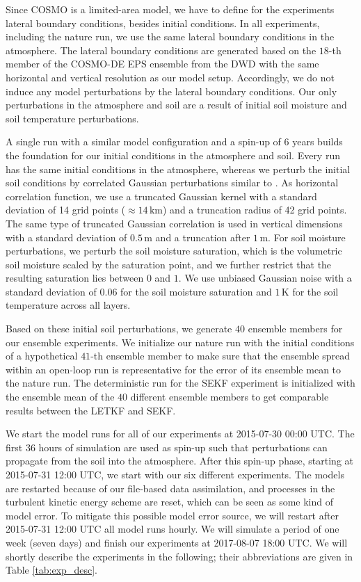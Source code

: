 \documentclass[hess, manuscript]{copernicus}
\begin{document}
Since COSMO is a limited-area model, we have to define for the experiments lateral boundary conditions, besides initial conditions.
In all experiments, including the nature run, we use the same lateral boundary conditions in the atmosphere.
The lateral boundary conditions are generated based on the $18$-th member of the COSMO-DE EPS ensemble from the DWD with the same horizontal and vertical resolution as our model setup.
Accordingly, we do not induce any model perturbations by the lateral boundary conditions.
Our only perturbations in the atmosphere and soil are a result of initial soil moisture and soil temperature perturbations.

A single run with a similar model configuration and a spin-up of $6$ years builds the foundation for our initial conditions in the atmosphere and soil.
Every run has the same initial conditions in the atmosphere, whereas we perturb the initial soil conditions by correlated Gaussian perturbations similar to \cite{schraff_kilometre-scale_2016}.
As horizontal correlation function, we use a truncated Gaussian kernel with a standard deviation of 14 grid points ($\approx 14 \,\text{km}$) and a truncation radius of 42 grid points.
The same type of truncated Gaussian correlation is used in vertical dimensions with a standard deviation of $0.5\,\text{m}$ and a truncation after $1\,\text{m}$.
For soil moisture perturbations, we perturb the soil moisture saturation, which is the volumetric soil moisture scaled by the saturation point, and we further restrict that the resulting saturation lies between $0$ and $1$.
We use unbiased Gaussian noise with a standard deviation of $0.06$ for the soil moisture saturation and $1\,\text{K}$ for the soil temperature across all layers.

Based on these initial soil perturbations, we generate $40$ ensemble members for our ensemble experiments.
We initialize our nature run with the initial conditions of a hypothetical $41$-th ensemble member to make sure that the ensemble spread within an open-loop run is representative for the error of its ensemble mean to the nature run.
The deterministic run for the SEKF experiment is initialized with the ensemble mean of the $40$ different ensemble members to get comparable results between the LETKF and SEKF.

We start the model runs for all of our experiments at 2015-07-30 00:00 UTC.
The first $36$ hours of simulation are used as spin-up such that perturbations can propagate from the soil into the atmosphere.
After this spin-up phase, starting at 2015-07-31 12:00 UTC, we start with our six different experiments.
The models are restarted because of our file-based data assimilation, and processes in the turbulent kinetic energy scheme are reset, which can be seen as some kind of model error.
To mitigate this possible model error source, we will restart after 2015-07-31 12:00 UTC all model runs hourly.
We will simulate a period of one week (seven days) and finish our experiments at 2017-08-07 18:00 UTC.
We will shortly describe the experiments in the following; their abbreviations are given in Table \ref{tab:exp_desc}.\\
\end{document}
